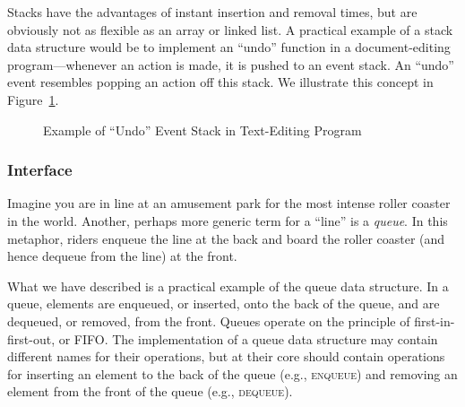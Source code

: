 Stacks have the advantages of instant insertion and removal times, but are obviously not as flexible as an array or linked list. 
A practical example of a stack data structure would be to implement an ``undo'' function in a document-editing program---whenever an action is made, it is pushed to an event stack. 
An ``undo'' event resembles popping an action off this stack. 
We illustrate this concept in Figure~\ref{fig:stackundo}.

\begin{figure}[ht]
\begin{center}
\end{center}
\caption{Example of ``Undo'' Event Stack in Text-Editing Program}
\label{fig:stackundo}
\end{figure}

\subsubsection*{ Interface}
Imagine you are in line at an amusement park for the most intense roller coaster in the world. 
Another, perhaps more generic term for a ``line'' is a \emph{queue}.
In this metaphor, riders enqueue the line at the back and board the roller coaster (and hence dequeue from the line) at the front. 

What we have described is a practical example of the queue data structure. 
In a queue, elements are enqueued, or inserted, onto the back of the queue, and are dequeued, or removed, from the front. 
Queues operate on the principle of first-in-first-out, or FIFO. 
The implementation of a queue data structure may contain different names for their operations, but at their core should contain operations for inserting an element to the back of the queue (e.g., \textsc{enqueue}) and removing an element from the front of the queue (e.g., \textsc{dequeue}). 

